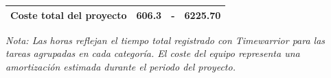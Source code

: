 \begin{table}[htbp]
\begin{tabular}{l S[table-format=3.1] S[table-format=2.0] S[table-format=4.2]}
        \textbf{Coste total del proyecto} & \textbf{606.3} & {-} & \textbf{6225.70} \\
        \bottomrule
    \end{tabular}
    \par\medskip %
    \footnotesize %
    \textit{Nota: Las horas reflejan el tiempo total registrado con Timewarrior para las tareas agrupadas en cada categoría. El coste del equipo representa una amortización estimada durante el periodo del proyecto.}
\end{table}
\clearpage %

